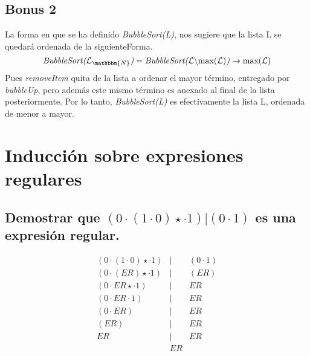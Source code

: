 \documentclass[11pt]{utalcaDoc}
\numberwithin{equation}{section}
\begin{document}
\subsection{Bonus 2}
La forma en que se ha definido \textit{BubbleSort(L)}, nos sugiere que la lista L se quedará ordenada de la siguienteForma.
\begin{equation*}
\textit{BubbleSort(}\mathcal{L}_{\mathbbm{N}}\textit{)} = \textit{BubbleSort(} \mathcal{L}\backslash\text{max(}\mathcal{L}\text{)} \textit{)} \to \text{max(}\mathcal{L}\text{)}
\end{equation*}
Pues \textit{removeItem} quita de la lista a ordenar el mayor término, entregado por \textit{bubbleUp}, pero además este mismo término es anexado al final de la lista posteriormente.
Por lo tanto, \textit{BubbleSort(L)} es efectivamente la lista L, ordenada de menor a mayor.

\newpage

\section{Inducción sobre expresiones regulares}
\subsection{Demostrar que $(0\cdot(1\cdot0)\star\cdot1)|(0\cdot1)$ es una expresión regular.}
\begin{eqnarray*}
	(0\cdot(1\cdot0)\star\cdot1)&|&(0\cdot1)\\
	(0\cdot (ER)\star\cdot1)&|&(ER)\\
	(0\cdot ER\star\cdot1)&|& ER\\
	(0\cdot ER\cdot1)&|& ER\\
	(0\cdot ER)&|& ER\\
	(ER)&|& ER\\
	ER &|& ER\\
   	&ER&\\
\end{eqnarray*}
\end{document}
